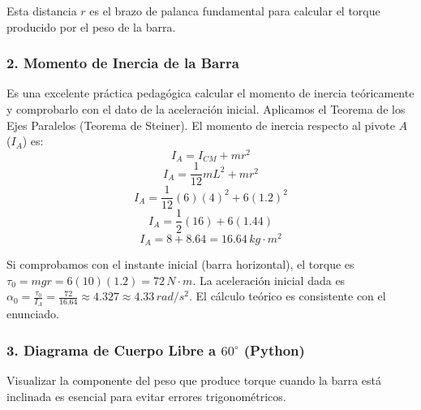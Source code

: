 \documentclass[12pt, a4paper]{article}
\begin{document}
Esta distancia $r$ es el brazo de palanca fundamental para calcular el torque producido por el peso de la barra.

\subsubsection*{2. Momento de Inercia de la Barra}
Es una excelente práctica pedagógica calcular el momento de inercia teóricamente y comprobarlo con el dato de la aceleración inicial. Aplicamos el Teorema de los Ejes Paralelos (Teorema de Steiner). El momento de inercia respecto al pivote $A$ ($I_A$) es:
$$I_A = I_{CM} + m r^2$$
$$I_A = \frac{1}{12} m L^2 + m r^2$$
$$I_A = \frac{1}{12}(6)(4)^2 + 6(1.2)^2$$
$$I_A = \frac{1}{2}(16) + 6(1.44)$$
$$I_A = 8 + 8.64 = 16.64 \, \si{kg\cdot m^2}$$

Si comprobamos con el instante inicial (barra horizontal), el torque es $\tau_0 = mg r = 6(10)(1.2) = 72 \, \si{N\cdot m}$.
La aceleración inicial dada es $\alpha_0 = \frac{\tau_0}{I_A} = \frac{72}{16.64} \approx 4.327 \approx 4.33 \, \si{rad/s^2}$. El cálculo teórico es consistente con el enunciado.

\subsubsection*{3. Diagrama de Cuerpo Libre a $60^\circ$ (Python)}
Visualizar la componente del peso que produce torque cuando la barra está inclinada es esencial para evitar errores trigonométricos.
\end{document}
